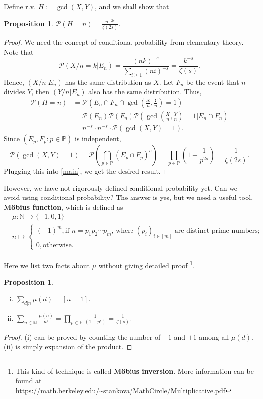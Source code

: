 \documentclass[12pt]{article}
\newtheorem{proposition}[theorem]{Proposition}
\newcommand\N{\mathbb{N}}
\newcommand\pp{\mathcal{P}}
\newcommand\PP{\mathbb{P}}
\newcommand\pr[1]{\mathcal{P} \left( #1\right)}
\begin{document}
Define r.v. $H := \gcd(X,Y)$, and we shall show that
\begin{proposition} \label{gcd}
    $\pp(H = n) = \frac{n^{-2s}}{\zeta(2s)}$.
\end{proposition}
\begin{proof}
    We need the concept of conditional probability 
    from elementary theory. Note that 
    $$
        \pr{X/n = k| E_n}
        = \frac{(nk)^{-s}}{\sum_{i \geq 1}(ni)^{-s}} 
        = \frac{k^{-s}}{\zeta(s)}.
    $$
    Hence, $(X/n | E_n)$ has the same distribution as $X$.
    Let $F_n$ be the event that $n$ divides $Y$, 
    then $(Y/n|E_n)$ also has the same distribution.
    Thus,
    \begin{equation} \label{main}
    \begin{aligned}
        \pp(H = n) &= \pr{E_n \cap F_n \cap {\gcd (\frac{X}{n},\frac{Y}{n}) = 1}} \\
         &= \pp(E_n) \pp(F_n) \pr{\gcd (\frac{X}{n},\frac{Y}{n}) = 1 | E_n \cap F_n} \\
         &= n^{-s} \cdot n^{-s} \cdot \pp(\gcd(X,Y) = 1).
    \end{aligned}
    \end{equation}
    Since $(E_p,F_p: p\in\PP)$ is independent, 
    $$
        \pp(\gcd(X,Y) = 1) = \pp(\bigcap_{p \in \PP}(E_p \cap F_p)^c)
        = \prod_{p\in \PP} (1 - \frac{1}{p^{2s}}) = \frac{1}{\zeta(2s)}.
    $$
    Plugging this into \cref{main}, we get the desired result.
\end{proof}

However, we have not rigorously defined conditional probability yet.
Can we avoid using conditional probability?
The answer is yes, but we need a useful tool, \textbf{Möbius function},
which is defined as 
\begin{align*}
    &\mu : \N \to \{-1,0,1\} \\
     &n \mapsto \begin{cases}
        (-1)^{m}, \text{if $n = p_1p_2\cdots p_m$, where $(p_i)_{i \in [m]}$ are distinct prime numbers};\\
        0, \text{otherwise}.
    \end{cases}
\end{align*}

Here we list two facts about $\mu$ without giving detailed proof
\footnote{This kind of technique is called \textbf{Möbius inversion}.
More information can be found at 
\url{https://math.berkeley.edu/~stankova/MathCircle/Multiplicative.pdf}}.
\begin{proposition} \label{mu} 
    \begin{enumerate}[(i)]
        \item $\sum_{d|n} \mu(d) = [n = 1]$.
        \item $\sum_{n \in \N} \frac{\mu(n)}{n^s} 
        = \prod_{p \in \PP} \frac{1}{(1 - p^{s})} = \frac{1}{\zeta(s)}$.
    \end{enumerate}
\end{proposition} 
\begin{proof}
    (i) can be proved by counting the number of $-1$ and $+1$
    among all $\mu(d)$. (ii) is simply expansion of the product.
\end{proof}
\end{document}
